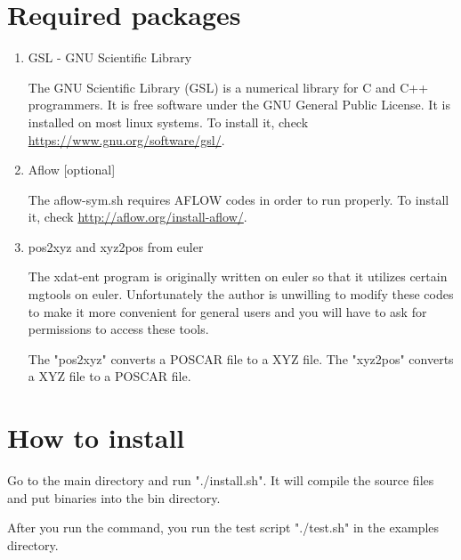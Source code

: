 \documentclass[11pt]{article}
\begin{document}
\section{Required packages}
\label{sec:org87dc4ed}
\begin{enumerate}
\item GSL - GNU Scientific Library

The GNU Scientific Library (GSL) is a numerical library for C and C++
programmers. It is free software under the GNU General Public License. 
It is installed on most linux systems. To install it, check \url{https://www.gnu.org/software/gsl/}.

\item Aflow [optional]

The aflow-sym.sh requires AFLOW codes in order to run properly. 
To install it, check \url{http://aflow.org/install-aflow/}.

\item pos2xyz and xyz2pos from euler

The xdat-ent program is originally written on euler so that it utilizes certain
mgtools on euler. Unfortunately the author is unwilling to modify
these codes to make it more convenient for general users and you will have to
ask for permissions to access these tools.

The "pos2xyz" converts a POSCAR file to a XYZ file.
The "xyz2pos" converts a XYZ file to a POSCAR file.
\end{enumerate}

\section{How to install}
\label{sec:org8ee82fe}
Go to the main directory and run "./install.sh". It will compile the source
files and put binaries into the bin directory.

After you run the command, you run the test script "./test.sh" in the examples directory.
\end{document}
